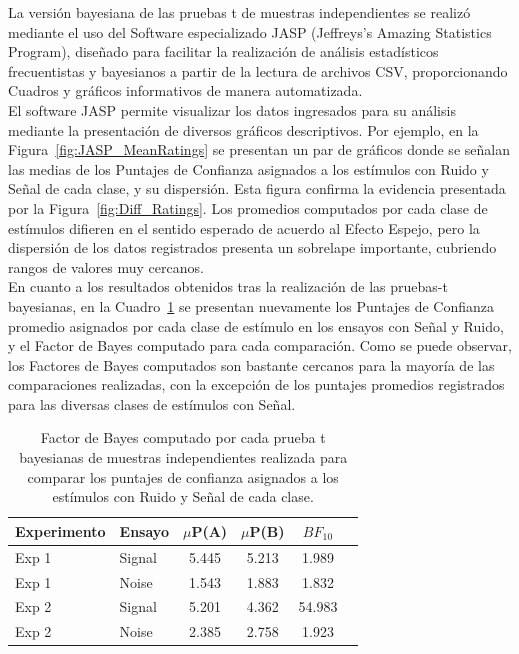 La versión bayesiana de las pruebas t de muestras independientes se realizó mediante el uso del Software especializado JASP (Jeffreys's Amazing Statistics Program), diseñado para facilitar la realización de análisis estadísticos frecuentistas y bayesianos a partir de la lectura de archivos CSV, proporcionando Cuadros y gráficos informativos de manera automatizada.\\

El software JASP permite visualizar los datos ingresados para su análisis mediante la presentación de diversos gráficos descriptivos. Por ejemplo, en la Figura~\ref{fig:JASP_MeanRatings} se presentan un par de gráficos donde se señalan las medias de los Puntajes de Confianza asignados a los estímulos con Ruido y Señal de cada clase, y su dispersión. Esta figura confirma la evidencia presentada por la Figura~\ref{fig:Diff_Ratings}. Los promedios computados por cada clase de estímulos difieren en el sentido esperado de acuerdo al Efecto Espejo, pero la dispersión de los datos registrados presenta un sobrelape importante, cubriendo rangos de valores muy cercanos.\\

En cuanto a los resultados obtenidos tras la realización de las pruebas-t bayesianas, en la Cuadro~\ref{Cuadro_t-Bayesian} se presentan nuevamente los Puntajes de Confianza promedio asignados por cada clase de estímulo en los ensayos con Señal y Ruido, y el Factor de Bayes computado para cada comparación. Como se puede observar, los Factores de Bayes computados son bastante cercanos para la mayoría de las comparaciones realizadas, con la excepción de los puntajes promedios registrados para las diversas clases de estímulos con Señal.\\

\begin{table}[h]
\caption[Prueba t bayesiana para evaluar las diferencias entre las medias de los puntajes de confianza asigandos a los estímulos con señal y ruido de cada clase]{Factor de Bayes computado por cada prueba t bayesianas de muestras independientes realizada para comparar los puntajes de confianza asignados a los estímulos con Ruido y Señal de cada clase.}
\label{Cuadro_t-Bayesian}
\centering
\begin{tabular}{l l |  c c c c}
\toprule
\textbf{Experimento} & \textbf{Ensayo} & \textbf{$\mu$P(A)} & \textbf{$\mu$P(B)} & \textbf{$BF_{10}$} \\
\midrule
Exp 1 & Signal & 5.445 & 5.213 & 1.989 \\
Exp 1 & Noise & 1.543 & 1.883 & 1.832 \\
Exp 2 & Signal & 5.201 & 4.362  & 54.983 \\
Exp 2 & Noise & 2.385 & 2.758 & 1.923 \\
\bottomrule
\end{tabular}
\end{table}

